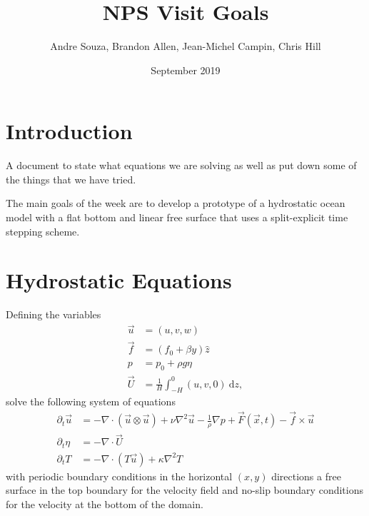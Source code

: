 \documentclass{article}
\title{NPS Visit Goals}
\author{Andre Souza, Brandon Allen, Jean-Michel Campin, Chris Hill}
\date{September 2019}
\begin{document}
\maketitle

\section{Introduction}

A document to state what equations we are solving as well as put down some of the things that we have tried.

The main goals of the week are to develop a prototype of a hydrostatic ocean model with a flat bottom and linear free surface that uses a split-explicit time stepping scheme.

\section{Hydrostatic Equations}

Defining the variables
\begin{align}
    \vec u & = (u, v, w) \\
    \vec f & = (f_0 + \beta y) \hat z \\
    p & = p_0 + \rho g \eta \\
    \vec U & = \frac{1}{H} \int_{-H}^0 (u,v,0) \: \mathrm{d}z ,
\end{align}
solve the following system of equations
\begin{align}
    \partial_t \vec u & = - \nabla \cdot (\vec u \otimes \vec u) + \nu \nabla^2 \vec u - \frac{1}{\rho} \nabla p + \vec F(\vec x, t) - \vec f \times \vec u \\
    \partial_t \eta & = - \nabla \cdot \vec U \\
    \partial_t T & = - \nabla \cdot (T \vec u) + \kappa \nabla^2 T
\end{align}
with periodic boundary conditions in the horizontal $(x,y)$ directions a free surface in the top boundary for the velocity field and no-slip boundary conditions for the velocity at the bottom of the domain.
\end{document}
